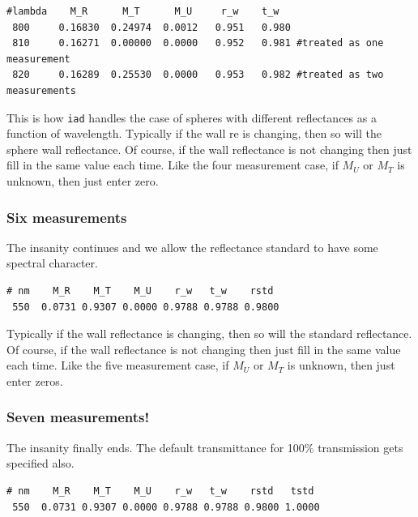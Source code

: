\documentclass{article}
\newcommand\iadprog{\texttt{iad}}
\begin{document}
\begin{center}
\begin{minipage}{8cm}
\scriptsize
\begin{verbatim}
#lambda	   M_R      M_T      M_U     r_w    t_w
 800     0.16830  0.24974  0.0012   0.951   0.980
 810     0.16271  0.00000  0.0000   0.952   0.981 #treated as one measurement
 820     0.16289  0.25530  0.0000   0.953   0.982 #treated as two measurements
\end{verbatim}
\end{minipage}
\end{center}
This is how \iadprog{} handles the case of spheres with
different reflectances as a function of wavelength.  Typically if the
wall re is changing, then so will the sphere wall reflectance.  Of course,
if the wall reflectance is not changing then just fill in the same value
each time.  Like the four measurement case, if $M_U$ or $M_T$ is unknown,
then just enter zero.

\subsubsection{Six measurements}
The insanity continues and we allow the reflectance
standard to have some spectral character.
\begin{center}
\begin{minipage}{8cm}
\scriptsize
\begin{verbatim}
# nm    M_R    M_T    M_U    r_w   t_w    rstd
 550  0.0731 0.9307 0.0000 0.9788 0.9788 0.9800
\end{verbatim}
\end{minipage}
\end{center}
Typically if the wall reflectance is changing, then so will the 
standard reflectance.  Of course,
if the wall reflectance is not changing then just fill in the same value
each time.  Like the five measurement case, if $M_U$ or $M_T$ is unknown,
then just enter zeros.

\subsubsection{Seven measurements!}
The insanity finally ends.  The default transmittance for
100\% transmission gets specified also.
\begin{center}
\begin{minipage}{8cm}
\scriptsize
\begin{verbatim}
# nm    M_R    M_T    M_U    r_w   t_w    rstd   tstd
 550  0.0731 0.9307 0.0000 0.9788 0.9788 0.9800 1.0000
\end{verbatim}
\end{minipage}
\end{center}
\end{document}
